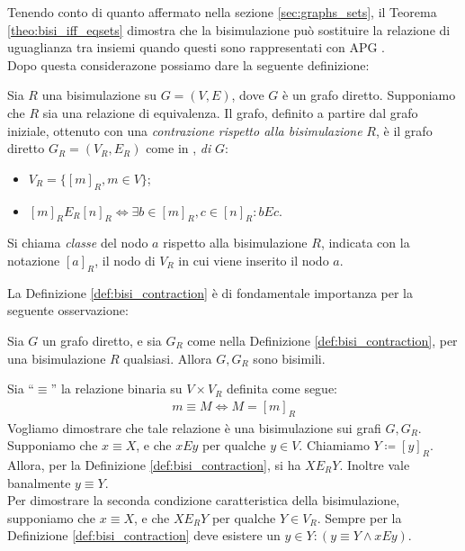 Tenendo conto di quanto affermato nella sezione \ref{sec:graphs_sets}, il Teorema \ref{theo:bisi_iff_eqsets} dimostra che la bisimulazione può sostituire la relazione di uguaglianza tra insiemi quando questi sono rappresentati con APG \cite{dovier}.\\

Dopo questa considerazone possiamo dare la seguente definizione:
\begin{definition}
    \label{def:bisi_contraction}
    Sia $R$ una bisimulazione su $G = (V,E)$, dove $G$ è un grafo diretto. Supponiamo che $R$ sia una relazione di equivalenza. Il grafo, definito a partire dal grafo iniziale, ottenuto con una \emph{contrazione rispetto alla bisimulazione} $R$, è il grafo diretto $G_R = (V_R, E_R)$ come in \cite{gentilini},  \emph{di} $G$:
    \begin{itemize}
        \item $V_R = \{[m]_R, m \in V\}$;
        \item $[m]_R E_R [n]_R \iff \exists b \in [m]_R, c \in [n]_R : b E c$.
    \end{itemize}
    Si chiama \emph{classe} del nodo $a$ rispetto alla bisimulazione $R$, indicata con la notazione $[a]_R$, il nodo di $V_R$ in cui viene inserito il nodo $a$.
\end{definition}
La Definizione \ref{def:bisi_contraction} è di fondamentale importanza per la seguente osservazione:
\begin{proposition}
    Sia $G$ un grafo diretto, e sia $G_R$ come nella Definizione \ref{def:bisi_contraction}, per una bisimulazione $R$ qualsiasi. Allora $G, G_R$ sono bisimili.
    \label{prop:bisi_cont_bisi}
\end{proposition}
\begin{proof2}
    Sia ``$\equiv$'' la relazione binaria su $V\times V_R$ definita come segue:
    \begin{gather*}
        m \equiv M \iff M = [m]_R
    \end{gather*}
    Vogliamo dimostrare che tale relazione è una bisimulazione sui grafi $G, G_R$.\\
    Supponiamo che $x \equiv X$, e che $x E y$ per qualche $y \in V$. Chiamiamo $Y \coloneqq [y]_R$. Allora, per la Definizione \ref{def:bisi_contraction}, si ha $X E_R Y$. Inoltre vale banalmente $y \equiv Y$.\\
    Per dimostrare la seconda condizione caratteristica della bisimulazione, supponiamo che $x \equiv X$, e che $X E_R Y$ per qualche $Y \in V_R$. Sempre per la Definizione \ref{def:bisi_contraction} deve esistere un $y \in Y : (y \equiv Y \land x E y)$.
\end{proof2}
